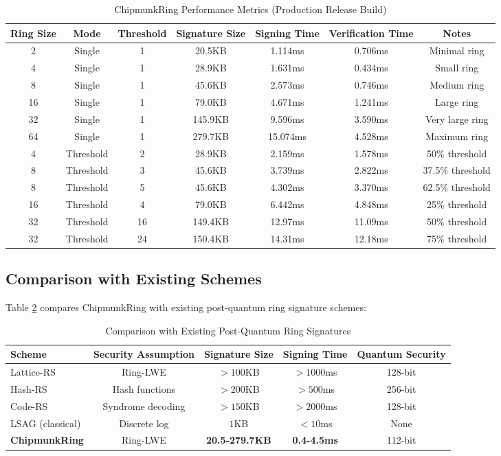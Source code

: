 \documentclass[11pt,a4paper]{article}
\begin{document}
\begin{table}[h]
\centering
\caption{ChipmunkRing Performance Metrics (Production Release Build)}
\label{tab:performance}
\begin{tabular}{@{}ccccccc@{}}
\toprule
Ring Size & Mode & Threshold & Signature Size & Signing Time & Verification Time & Notes \\
\midrule
2  & Single & 1 & 20.5KB & 1.114ms & 0.706ms & Minimal ring \\
4  & Single & 1 & 28.9KB & 1.631ms & 0.434ms & Small ring \\
8  & Single & 1 & 45.6KB & 2.573ms & 0.746ms & Medium ring \\
16 & Single & 1 & 79.0KB & 4.671ms & 1.241ms & Large ring \\
32 & Single & 1 & 145.9KB & 9.596ms & 3.590ms & Very large ring \\
64 & Single & 1 & 279.7KB & 15.074ms & 4.528ms & Maximum ring \\
\midrule
4  & Threshold & 2 & 28.9KB & 2.159ms & 1.578ms & 50\% threshold \\
8  & Threshold & 3 & 45.6KB & 3.739ms & 2.822ms & 37.5\% threshold \\
8  & Threshold & 5 & 45.6KB & 4.302ms & 3.370ms & 62.5\% threshold \\
16 & Threshold & 4 & 79.0KB & 6.442ms & 4.848ms & 25\% threshold \\
32 & Threshold & 16 & 149.4KB & 12.97ms & 11.09ms & 50\% threshold \\
32 & Threshold & 24 & 150.4KB & 14.31ms & 12.18ms & 75\% threshold \\
\bottomrule
\end{tabular}
\end{table}

\subsection{Comparison with Existing Schemes}

Table \ref{tab:comparison} compares ChipmunkRing with existing post-quantum ring signature schemes:

\begin{table}[h]
\centering
\caption{Comparison with Existing Post-Quantum Ring Signatures}
\label{tab:comparison}
\begin{tabular}{@{}lcccc@{}}
\toprule
Scheme & Security Assumption & Signature Size & Signing Time & Quantum Security \\
\midrule
Lattice-RS \cite{lattice-rings} & Ring-LWE & $>100$KB & $>1000$ms & 128-bit \\
Hash-RS \cite{hash-rings} & Hash functions & $>200$KB & $>500$ms & 256-bit \\
Code-RS \cite{code-rings} & Syndrome decoding & $>150$KB & $>2000$ms & 128-bit \\
LSAG (classical) \cite{lsag04} & Discrete log & $1$KB & $<10$ms & None \\
\textbf{ChipmunkRing} & Ring-LWE & \textbf{20.5-279.7KB} & \textbf{0.4-4.5ms} & 112-bit \\
\bottomrule
\end{tabular}
\end{table}
\end{document}
